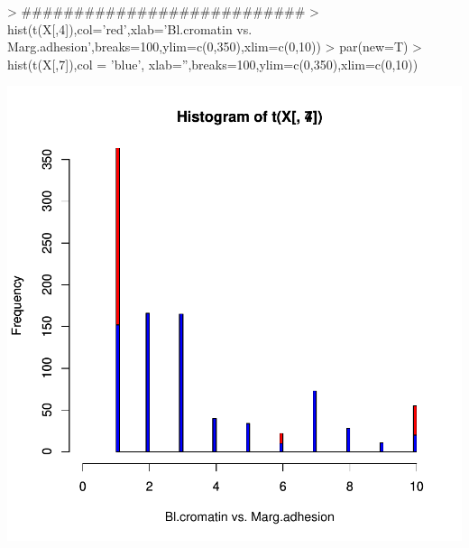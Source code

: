 \documentclass{article}
\begin{document}
\begin{Schunk}
\begin{Sinput}
> ###########################
> hist(t(X[,4]),col='red',xlab='Bl.cromatin vs. Marg.adhesion',breaks=100,ylim=c(0,350),xlim=c(0,10))
> par(new=T)
> hist(t(X[,7]),col = 'blue', xlab='',breaks=100,ylim=c(0,350),xlim=c(0,10))
\end{Sinput}
\end{Schunk}
\includegraphics{selecao-010}
\end{document}
